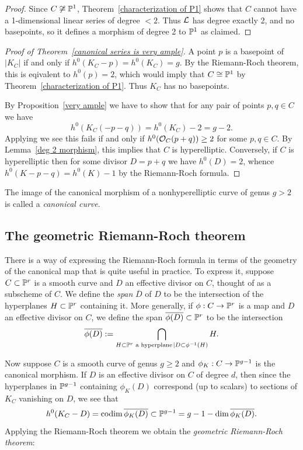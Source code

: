 \begin{proof}
Since $C \not\cong {\mathbb P}^1$,  Theorem~\ref{characterization of P1} shows that $C$ cannot have a 1-dimensional linear series
of degree $< 2$. Thus ${\mathcal L}$ has degree exactly 2, and no basepoints, so it defines a morphism of degree 2 to ${\mathbb P}^1$ as claimed.
\end{proof}

\begin{proof}[Proof of Theorem~\ref{canonical series is very ample}]
A point $p$ is a basepoint of $|K_C|$ if and only if $h^0(K_C-p) = h^0(K_C) = g$. By the Riemann-Roch theorem,
this is eqivalent to $h^0(p) =2$, which would imply that $C\cong {\mathbb P}^1$ by Theorem~\ref{characterization of P1}. Thus $K_C$
has no basepoints.

By Proposition~\ref{very ample} we have to show that for any pair of points $p, q \in C$ we have
$$
h^0(K_C(-p-q)) = h^0(K_C)-2 = g-2.
$$
Applying \trr we see this fails if and only if $h^0({\mathcal O}_C(p+q)) \geq 2$ for some $p,q \in C$. By Lemma~\ref{deg 2 morphism}, this implies that $C$ is hyperelliptic. Conversely, if $C$ is hyperelliptic then for some divisor $D = p+q$ we have $h^0(D) = 2$, whence $h^0(K-p-q) = h^0(K) -1$ by
the Riemann-Roch formula.
\end{proof}

The image of the canonical morphism of a nonhyperelliptic curve of genus $g>2$ is called a \emph{canonical curve}.


\subsection{The geometric Riemann-Roch theorem}

There is a way of expressing the Riemann-Roch formula in terms of the geometry of the canonical map that is quite useful in practice. To express it, suppose $C \subset {\mathbb P}^r$ is a smooth curve and $D$ an effective divisor on $C$, thought of as a subscheme of $C$. We define the \emph{span} $\overline D$ of $D$ to be the intersection of the hyperplanes $H \subset {\mathbb P}^r$ containing it. More generally, if $\phi : C \to {\mathbb P}^r$ is a map and $D$ an effective divisor on $C$, we define the span $\overline{\phi(D)} \subset {\mathbb P}^r$ to be the intersection
$$
\overline{\phi(D)} := \bigcap_{H \subset {\mathbb P}^r \text{ a hyperplane}\kern1pt \mid D \subset \phi^{-1}(H)} H.
$$

Now suppose $C$ is a smooth curve of genus $g\geq 2$ and $\phi_K: C\to {\mathbb P}^{g-1}$ is the canonical morphism.
If  $D$ is an effective divisor on $C$ of degree $d$, then since the hyperplanes in ${\mathbb P}^{g-1}$ containing $\phi_K(D)$ correspond (up to scalars) to sections of $K_C$ vanishing on $D$, we see that
$$
h^0(K_C-D) = \operatorname{codim} \overline{ \phi_K(D)} \subset {\mathbb P}^{g-1}= g - 1 - \dim \overline{ \phi_K(D)}.
$$
Applying the Riemann-Roch theorem we obtain  the \emph{geometric Riemann-Roch theorem}:


